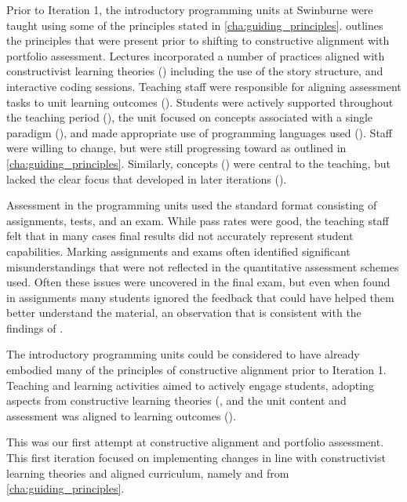 Prior to Iteration 1, the introductory programming units at Swinburne were taught using some of the principles stated in \cref{cha:guiding_principles}.  outlines the principles that were present prior to shifting to constructive alignment with portfolio assessment. Lectures incorporated a number of practices aligned with constructivist learning theories () including the use of the story structure, and interactive coding sessions. Teaching staff were responsible for aligning assessment tasks to unit learning outcomes (). Students were actively supported throughout the teaching period (), the unit focused on concepts associated with a single paradigm (), and made appropriate use of programming languages used (). Staff were willing to change, but were still progressing toward  as outlined in \cref{cha:guiding_principles}. Similarly, concepts () were central to the teaching, but lacked the clear focus that developed in later iterations ().

Assessment in the programming units used the standard format consisting of assignments, tests, and an exam. While pass rates were good, the teaching staff felt that in many cases final results did not accurately represent student capabilities. Marking assignments and exams often identified significant misunderstandings that were not reflected in the quantitative assessment schemes used. Often these issues were uncovered in the final exam, but even when found in assignments many students ignored the feedback that could have helped them better understand the material, an observation that is consistent with the findings of \citet{Black:1998}. 

The introductory programming units could be considered to have already embodied many of the principles of constructive alignment prior to Iteration 1. Teaching and learning activities aimed to actively engage students, adopting aspects from constructive learning theories (, and the unit content and assessment was aligned to learning outcomes (). 





This was our first attempt at constructive alignment and portfolio assessment. This first iteration focused on implementing changes in line with constructivist learning theories and aligned curriculum, namely  and  from \cref{cha:guiding_principles}.

